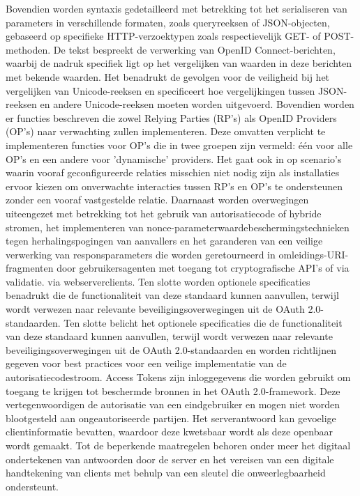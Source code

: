 Bovendien worden syntaxis gedetailleerd met betrekking tot het serialiseren van parameters in verschillende formaten, zoals queryreeksen of JSON-objecten, gebaseerd op specifieke HTTP-verzoektypen zoals respectievelijk GET- of POST-methoden.
\newline
De tekst bespreekt de verwerking van OpenID Connect-berichten, waarbij de nadruk specifiek ligt op het vergelijken van waarden in deze berichten met bekende waarden. Het benadrukt de gevolgen voor de veiligheid bij het vergelijken van Unicode-reeksen en specificeert hoe vergelijkingen tussen JSON-reeksen en andere Unicode-reeksen moeten worden uitgevoerd.
\newline
Bovendien worden er functies beschreven die zowel Relying Parties (RP's) als OpenID Providers (OP's) naar verwachting zullen implementeren. Deze omvatten verplicht te implementeren functies voor OP's die in twee groepen zijn vermeld: één voor alle OP's en een andere voor 'dynamische' providers.
\newline
Het gaat ook in op scenario's waarin vooraf geconfigureerde relaties misschien niet nodig zijn als installaties ervoor kiezen om onverwachte interacties tussen RP's en OP's te ondersteunen zonder een vooraf vastgestelde relatie.
\newline
Daarnaast worden overwegingen uiteengezet met betrekking tot het gebruik van autorisatiecode of hybride stromen, het implementeren van nonce-parameterwaardebeschermingstechnieken tegen herhalingspogingen van aanvallers en het garanderen van een veilige verwerking van responsparameters die worden geretourneerd in omleidings-URI-fragmenten door gebruikersagenten met toegang tot cryptografische API's of via validatie. via webserverclients.
\newline
Ten slotte worden optionele specificaties benadrukt die de functionaliteit van deze standaard kunnen aanvullen, terwijl wordt verwezen naar relevante beveiligingsoverwegingen uit de OAuth 2.0-standaarden.
\newline
\newline
Ten slotte belicht het optionele specificaties die de functionaliteit van deze standaard kunnen aanvullen, terwijl wordt verwezen naar relevante beveiligingsoverwegingen uit de OAuth 2.0-standaarden en worden richtlijnen gegeven voor best practices voor een veilige implementatie van de autorisatiecodestroom.
\newline
Access Tokens zijn inloggegevens die worden gebruikt om toegang te krijgen tot beschermde bronnen in het OAuth 2.0-framework. Deze vertegenwoordigen de autorisatie van een eindgebruiker en mogen niet worden blootgesteld aan ongeautoriseerde partijen. Het serverantwoord kan gevoelige clientinformatie bevatten, waardoor deze kwetsbaar wordt als deze openbaar wordt gemaakt. Tot de beperkende maatregelen behoren onder meer het digitaal ondertekenen van antwoorden door de server en het vereisen van een digitale handtekening van clients met behulp van een sleutel die onweerlegbaarheid ondersteunt.
